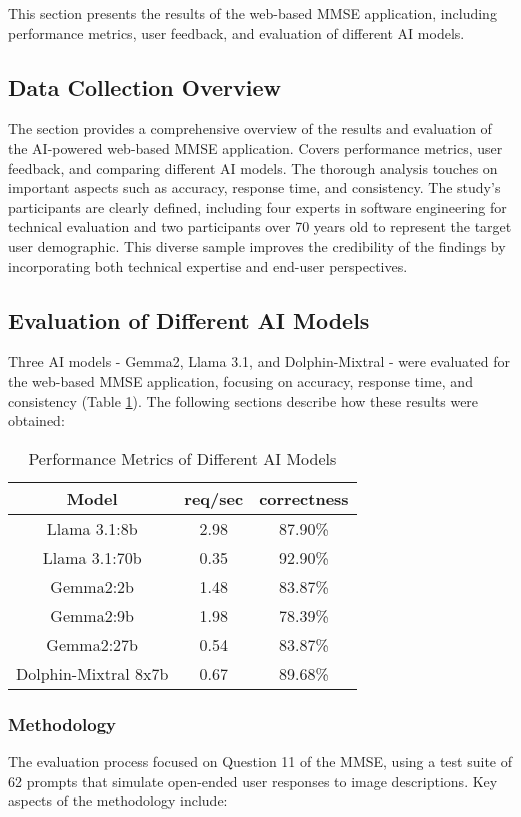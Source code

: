 This section presents the results of the web-based MMSE application, including performance metrics, user feedback, and evaluation of different AI models.

\subsection{Data Collection Overview}
The section provides a comprehensive overview of the results and evaluation of the AI-powered web-based MMSE application. Covers performance metrics, user feedback, and comparing different AI models. The thorough analysis touches on important aspects such as accuracy, response time, and consistency. The study's participants are clearly defined, including four experts in software engineering for technical evaluation and two participants over 70 years old to represent the target user demographic. This diverse sample improves the credibility of the findings by incorporating both technical expertise and end-user perspectives.

\subsection{Evaluation of Different AI Models}
Three AI models - Gemma2, Llama 3.1, and Dolphin-Mixtral - were evaluated for the web-based MMSE application, focusing on accuracy, response time, and consistency (Table \ref{tab:model_comparison}). The following sections describe how these results were obtained:

\begin{table}[ht]
\centering
\begin{tabular}{|c|c|c|}
\hline
\textbf{Model} & \textbf{req/sec} & \textbf{correctness} \\
\hline
Llama 3.1:8b & 2.98 & 87.90\% \\
Llama 3.1:70b & 0.35 & 92.90\% \\
Gemma2:2b & 1.48 & 83.87\% \\
Gemma2:9b & 1.98 & 78.39\% \\
Gemma2:27b & 0.54 & 83.87\% \\
Dolphin-Mixtral 8x7b & 0.67 & 89.68\% \\
\hline
\end{tabular}
\caption{Performance Metrics of Different AI Models}
\label{tab:model_comparison}
\end{table}

\subsubsection{Methodology}
The evaluation process focused on Question 11 of the MMSE, using a test suite of 62 prompts that simulate open-ended user responses to image descriptions. Key aspects of the methodology include:

